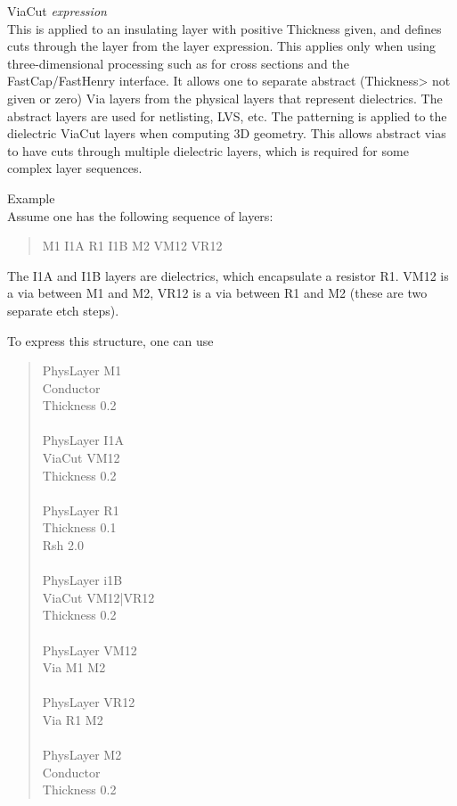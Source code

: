 \begin{description}
\item{\et ViaCut {\it expression\/}}\\
This is applied to an insulating layer with positive {\et
Thickness} given, and defines cuts through the layer from the
layer expression.  This applies only when using
three-dimensional processing such as for cross sections and
the FastCap/FastHenry interface.  It allows one to separate
abstract ({\et Thickness}> not given or zero) {\et Via} layers
from the physical layers that represent dielectrics.  The
abstract layers are used for netlisting, LVS, etc.  The
patterning is applied to the dielectric {\et ViaCut} layers
when computing 3D geometry.  This allows abstract vias to have
cuts through multiple dielectric layers, which is required for
some complex layer sequences.

Example\\
Assume one has the following sequence of layers:
\begin{quote}\vt
M1 I1A R1 I1B M2 VM12 VR12
\end{quote}

The {\vt I1A} and {\vt I1B} layers are dielectrics, which
encapsulate a resistor {\vt R1}.  {\vt VM12} is a via between
{\vt M1} and {\vt M2}, {\vt VR12} is a via between {\vt R1}
and {\vt M2} (these are two separate etch steps).

To express this structure, one can use
\begin{quote}\vt
PhysLayer M1\\
Conductor\\
Thickness 0.2\\
\\
PhysLayer I1A\\
ViaCut VM12\\
Thickness 0.2\\
\\
PhysLayer R1\\
Thickness 0.1\\
Rsh 2.0\\
\\
PhysLayer i1B\\
ViaCut VM12|VR12\\
Thickness 0.2\\
\\
PhysLayer VM12\\
Via M1 M2\\
\\
PhysLayer VR12\\
Via R1 M2\\
\\
PhysLayer M2\\
Conductor\\
Thickness 0.2\\
\end{quote}


\end{description}
